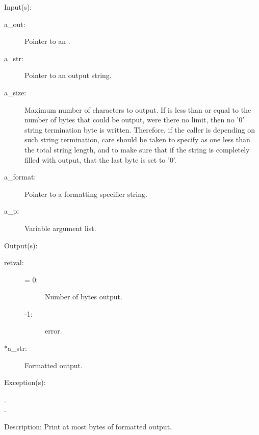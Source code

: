 \begin{capi}
\begin{capilist}
	\item[Input(s): ]
		\begin{description}\item[]
		\item[a\_out: ]
			Pointer to an .
		\item[a\_str: ]
			Pointer to an output string.
		\item[a\_size: ]
			Maximum number of characters to output.  If
			 is less than or equal to the number of
			bytes that could be output, were there no limit, then no
			'{\bs}0' string termination byte is written.  Therefore,
			if the caller is depending on such string termination,
			care should be taken to specify  as one
			less than the total string length, and to make sure that
			if the string is completely filled with output, that the
			last byte is set to '{\bs}0'.
		\item[a\_format: ]
			Pointer to a formatting specifier string.
		\item[a\_p: ]
			Variable argument list.
		\end{description}
	\item[Output(s): ]
		\begin{description}\item[]
		\item[retval: ]
			\begin{description}\item[]
			\item[{\gt}= 0: ]
				Number of bytes output.
			\item[-1: ]
				 error.
			\end{description}
		\item[*a\_str: ]
			Formatted output.
		\end{description}
	\item[Exception(s): ]
		\begin{description}\item[]
		\item[.]
		\item[.]
		\end{description}
	\item[Description: ]
		Print at most  bytes of formatted output.
	\end{capilist}
\label{spec_type_get}
\end{capi}
